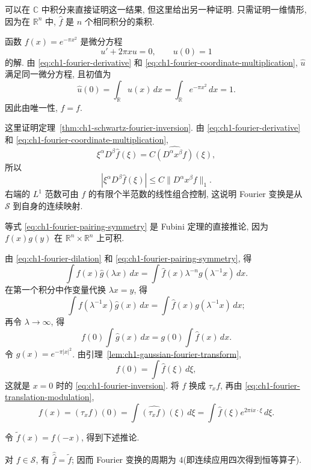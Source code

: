 \begin{Proof}
可以在 $\mathbb C$ 中积分来直接证明这一结果, 但这里给出另一种证明. 只需证明一维情形, 因为在 $\mathbb R^n$ 中, $\widehat f$ 是 $n$ 个相同积分的乘积.

函数 $f(x)=e^{-\pi x^2}$ 是微分方程
\[
 u'+2\pi xu=0,
 \qquad u(0)=1
\]
的解. 由 \eqref{eq:ch1-fourier-derivative} 和 \eqref{eq:ch1-fourier-coordinate-multiplication}, $\widehat u$ 满足同一微分方程, 且初值为
\[
 \widehat u(0)=\int_{\mathbb R}u(x)\,dx
 =\int_{\mathbb R}e^{-\pi x^2}\,dx=1.
\]
因此由唯一性, $\widehat f=f$.
\end{Proof}

\begin{Proof}
这里证明定理~\ref{thm:ch1-schwartz-fourier-inversion}. 由 \eqref{eq:ch1-fourier-derivative} 和 \eqref{eq:ch1-fourier-coordinate-multiplication},
\[
 \xi^\alpha D^\beta\widehat f(\xi)
 =C\widehat{(D^\alpha x^\beta f)}(\xi),
\]
所以
\[
 |\xi^\alpha D^\beta\widehat f(\xi)|
 \le C\|D^\alpha x^\beta f\|_1.
\]
右端的 $L^1$ 范数可由 $f$ 的有限个半范数的线性组合控制, 这说明 Fourier 变换是从 $\mathcal S$ 到自身的连续映射.

\hypertarget{chapter-01-page-026}{}
等式 \eqref{eq:ch1-fourier-pairing-symmetry} 是 Fubini 定理的直接推论, 因为 $f(x)g(y)$ 在 $\mathbb R^n\times\mathbb R^n$ 上可积.

由 \eqref{eq:ch1-fourier-dilation} 和 \eqref{eq:ch1-fourier-pairing-symmetry}, 得
\[
 \int f(x)\widehat g(\lambda x)\,dx
 =\int\widehat f(x)\lambda^{-n}g(\lambda^{-1}x)\,dx.
\]
在第一个积分中作变量代换 $\lambda x=y$, 得
\[
 \int f(\lambda^{-1}x)\widehat g(x)\,dx
 =\int\widehat f(x)g(\lambda^{-1}x)\,dx;
\]
再令 $\lambda\to\infty$, 得
\[
 f(0)\int\widehat g(x)\,dx=g(0)\int\widehat f(x)\,dx.
\]
令 $g(x)=e^{-\pi|x|^2}$. 由引理~\ref{lem:ch1-gaussian-fourier-transform},
\[
 f(0)=\int\widehat f(\xi)\,d\xi,
\]
这就是 $x=0$ 时的 \eqref{eq:ch1-fourier-inversion}. 将 $f$ 换成 $\tau_xf$, 再由 \eqref{eq:ch1-fourier-translation-modulation},
\[
 f(x)=(\tau_xf)(0)=\int\widehat{(\tau_xf)}(\xi)\,d\xi
 =\int\widehat f(\xi)e^{2\pi ix\cdot\xi}\,d\xi.
\]
\end{Proof}

令 $\widetilde f(x)=f(-x)$, 得到下述推论.

\begin{Corollary}
\label{cor:ch1-fourier-period-four}
对 $f\in\mathcal S$, 有 $\widehat{\widehat f}=\widetilde f$; 因而 Fourier 变换的周期为 $4$(即连续应用四次得到恒等算子).
\end{Corollary}

